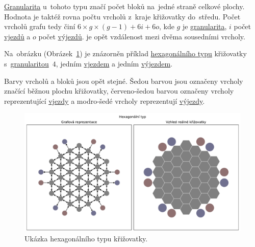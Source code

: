 \hyperref[par:granularita]{Granularita} u~tohoto typu značí počet bloků na~jedné straně celkové plochy.
Hodnota je taktéž rovna počtu vrcholů z~kraje křižovatky do~středu.
Počet vrcholů grafu tedy činí $6 \times g \times (g-1) + 6i + 6o$,
kde $g$ je \hyperref[par:granularita]{granularita},
$i$ počet \hyperref[par:vjezdy]{vjezdů} a $o$ počet \hyperref[par:vyjezdy]{výjezdů}.
 je opět vzdálenost mezi dvěma sousedními vrcholy.

Na~obrázku (Obrázek~\ref{fig:hexagonal_type_graph}) je znázorněn příklad
\hyperref[subsec:hexagonalni_typ]{hexagonálního typu} křižovatky s~\hyperref[par:granularita]{granularitou}~$4$,
jedním \hyperref[par:vjezdy]{vjezdem} a jedním \hyperref[par:vyjezdy]{výjezdem}.

Barvy vrcholů a bloků jsou opět stejné.
Šedou barvou jsou označeny vrcholy značící běžnou plochu křižovatky,
červeno-šedou barvou označeny vrcholy reprezentující \hyperref[par:vjezdy]{vjezdy} a
modro-šedé vrcholy reprezentují \hyperref[par:vyjezdy]{výjezdy}.

\begin{figure}[h]
  \centering
  \includegraphics[width=\textwidth]{../img/Hexagonal_grid}
  \caption{Ukázka hexagonálního typu křižovatky.}
  \label{fig:hexagonal_type_graph}
\end{figure}
